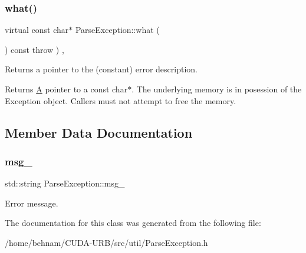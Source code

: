 \subsubsection{\texorpdfstring{what()}{what()}\hspace{0.1cm}{\footnotesize\ttfamily [3/3]}}
{\footnotesize\ttfamily virtual const char$\ast$ Parse\+Exception\+::what (\begin{DoxyParamCaption}{ }\end{DoxyParamCaption}) const throw  ) \hspace{0.3cm}{\ttfamily [inline]}, {\ttfamily [virtual]}}

Returns a pointer to the (constant) error description. \begin{DoxyReturn}{Returns}
\hyperlink{classA}{A} pointer to a const char$\ast$. The underlying memory is in posession of the Exception object. Callers must not attempt to free the memory. 
\end{DoxyReturn}


\subsection{Member Data Documentation}
\mbox{\label{classParseException_a1e21a45e6538896bb5c71cc7390d986b}} 
\subsubsection{\texorpdfstring{msg\+\_\+}{msg\_}}
{\footnotesize\ttfamily std\+::string Parse\+Exception\+::msg\+\_\+\hspace{0.3cm}{\ttfamily [protected]}}

Error message. 

The documentation for this class was generated from the following file\+:\begin{DoxyCompactItemize}
\item 
/home/behnam/\+C\+U\+D\+A-\/\+U\+R\+B/src/util/Parse\+Exception.\+h\end{DoxyCompactItemize}
